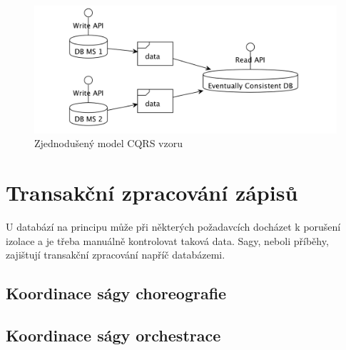 \begin{figure}[htbp]
   \centering
   \includegraphics[max width=\textwidth]{assets/cqrs}
   \caption{Zjednodušený model CQRS vzoru}\label{fig:cqrs}
\end{figure}



\section{Transakční zpracování zápisů}\label{sec:msa-db-transaction}

U databází na principu  může při některých požadavcích docházet k porušení izolace a je třeba manuálně kontrolovat taková data.
Sagy, neboli příběhy, zajištují transakční zpracování napříč databázemi.



\subsection{Koordinace ságy choreografie}\label{subsec:msa-db-transaction-coordinate-choreography}



\subsection{Koordinace ságy orchestrace}\label{subsec:msa-db-transaction-coordinate-orchestration}
